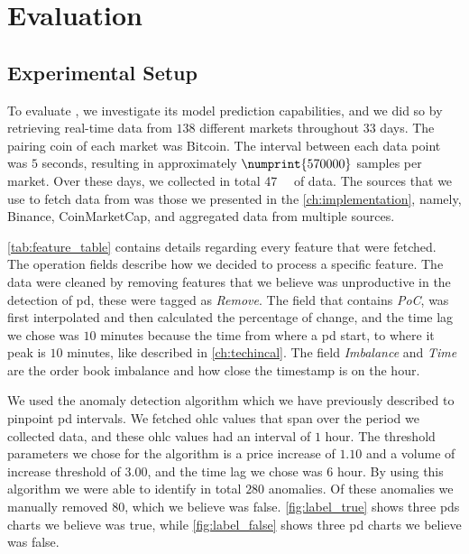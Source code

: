 
\chapter{Evaluation}\label{ch:evaluation}\glsresetall
\section{Experimental Setup}
To evaluate \project, we investigate its model prediction capabilities, and we did so by retrieving real-time data from $138$ different markets throughout $33$ days. The pairing coin of each market was Bitcoin. The interval between each data point was $5$ seconds, resulting in approximately $\numprint{570 000}$ samples per market. Over these days, we collected in total \SI{47}{\giga\byte} of data. The sources that we use to fetch data from was those we presented in the \autoref{ch:implementation}, namely, Binance, CoinMarketCap, and aggregated data from multiple sources. 

\autoref{tab:feature_table} contains details regarding every feature that were fetched. The operation fields describe how we decided to process a specific feature. The data were cleaned by removing features that we believe was unproductive in the detection of \ac{pd}, these were tagged as \emph{Remove}. The field that contains \emph{PoC}, was first interpolated and then calculated the percentage of change, and the time lag we chose was $10$ minutes because the time from where a \ac{pd} start, to where it peak is $10$ minutes, like described in \autoref{ch:techincal}. The field \emph{Imbalance} and \emph{Time} are the order book imbalance and how close the timestamp is on the hour.



We used the anomaly detection algorithm which we have previously described to pinpoint \ac{pd} intervals. We fetched \ac{ohlc} values that span over the period we collected data, and these \ac{ohlc} values had an interval of $1$ hour. The threshold parameters we chose for the algorithm is a price increase of $1.10$ and a volume of increase threshold of $3.00$, and the time lag we chose was $6$ hour. By using this algorithm we were able to identify in total $280$ anomalies. Of these anomalies we manually removed $80$, which we believe was false. \autoref{fig:label_true} shows three \acp{pd} charts we believe was true, while \autoref{fig:label_false} shows three \ac{pd} charts we believe was false.

